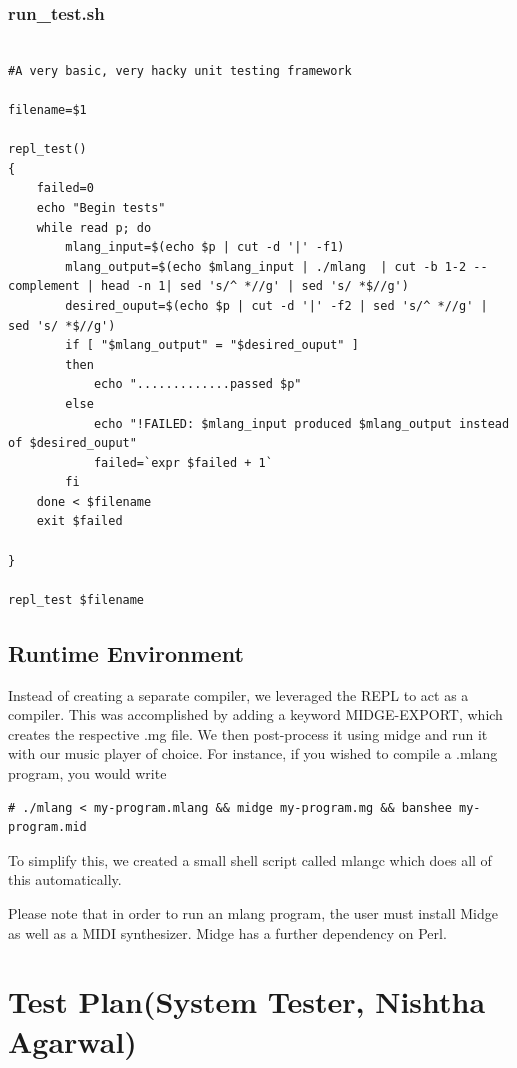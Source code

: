 \documentclass[letterpaper,11pt]{article}
\begin{document}
{\subsubsection{run\_test.sh}
\lstset{language=bash}
\begin{lstlisting}

#A very basic, very hacky unit testing framework

filename=$1

repl_test()
{
    failed=0
    echo "Begin tests"
    while read p; do
        mlang_input=$(echo $p | cut -d '|' -f1)
        mlang_output=$(echo $mlang_input | ./mlang  | cut -b 1-2 --complement | head -n 1| sed 's/^ *//g' | sed 's/ *$//g')
        desired_ouput=$(echo $p | cut -d '|' -f2 | sed 's/^ *//g' | sed 's/ *$//g')
        if [ "$mlang_output" = "$desired_ouput" ]
        then
            echo ".............passed $p"
        else
            echo "!FAILED: $mlang_input produced $mlang_output instead of $desired_ouput"
            failed=`expr $failed + 1`
        fi
    done < $filename
    exit $failed
    
}

repl_test $filename

\end{lstlisting}


\subsection{Runtime Environment}
Instead of creating a separate compiler, we leveraged the REPL to act as a compiler. This was accomplished by adding a keyword MIDGE-EXPORT, which
creates the respective .mg file. We then post-process it using midge and run it with our music player of choice. For instance, if you wished to
compile a .mlang program, you would write

\lstset{language=bash}
\begin{lstlisting}
# ./mlang < my-program.mlang && midge my-program.mg && banshee my-program.mid
\end{lstlisting}
To simplify this, we created a small shell script called mlangc which does all of this automatically.

Please note that in order to run an mlang program, the user must install Midge as well as a MIDI synthesizer. Midge has a further dependency on
Perl.

\section{Test Plan(System Tester, Nishtha Agarwal)}


}
\end{document}
